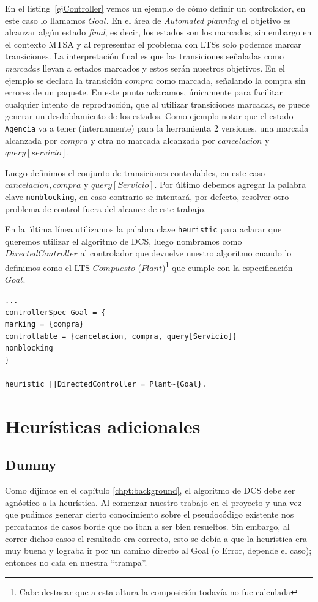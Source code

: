 En el listing~\ref{ejController} vemos un ejemplo de cómo definir un controlador, en este caso lo llamamos $Goal$. En el área de \textit{Automated planning} el objetivo es alcanzar algún estado \textit{final}, es decir, los estados son los marcados; sin embargo en el contexto MTSA y al representar el problema con LTSs solo podemos marcar transiciones. La interpretación final es que las transiciones señaladas como \textit{marcadas} llevan a estados marcados y estos serán nuestros objetivos. En el ejemplo se declara la transición $compra$ como marcada, señalando la compra sin errores de un paquete. En este punto aclaramos, únicamente para facilitar cualquier intento de reproducción, que al utilizar transiciones marcadas, se puede generar un desdoblamiento de los estados. Como ejemplo notar que el estado \texttt{Agencia} va a tener (internamente) para la herramienta 2 versiones, una marcada alcanzada por $compra$ y otra no marcada alcanzada por $cancelacion$ y $query[servicio]$.

Luego definimos el conjunto de transiciones controlables, en este caso $cancelacion, compra$ y $ query[Servicio]$. Por último debemos agregar la palabra clave \texttt{nonblocking}, en caso contrario se intentará, por defecto, resolver otro problema de control fuera del alcance de este trabajo.

En la última línea utilizamos la palabra clave \texttt{heuristic} para aclarar que queremos utilizar el algoritmo de DCS, luego nombramos como $DirectedController$ al controlador que devuelve nuestro algoritmo cuando lo definimos como el LTS $Compuesto$ ($Plant$)\footnote{Cabe destacar que a esta altura la composición todavía no fue calculada} que cumple con la especificación $Goal$.

\begin{lstlisting}[language = mtsa, caption=Ejemplo de Controller y DCS, label=ejController]
...
controllerSpec Goal = {
marking = {compra}
controllable = {cancelacion, compra, query[Servicio]}
nonblocking
}

heuristic ||DirectedController = Plant~{Goal}.
\end{lstlisting}

\section{Heurísticas adicionales}\label{chpt:heurist-nuevas}
\subsection{Dummy}
Como dijimos en el capítulo \ref{chpt:background}, el algoritmo de DCS debe ser agnóstico a la heurística. Al comenzar nuestro trabajo en el proyecto y una vez que pudimos generar cierto conocimiento sobre el pseudocódigo existente nos percatamos de casos borde que no iban a ser bien resueltos. Sin embargo, al correr dichos casos el resultado era correcto, esto se debía a que la heurística era muy buena y lograba ir por un camino directo al Goal (o Error, depende el caso); entonces no caía en nuestra ``trampa''.

